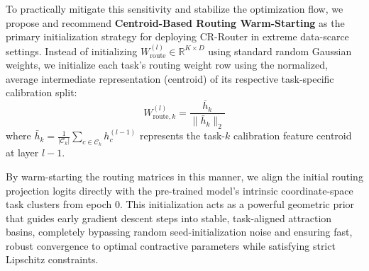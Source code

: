 To practically mitigate this sensitivity and stabilize the optimization flow, we propose and recommend \textbf{Centroid-Based Routing Warm-Starting} as the primary initialization strategy for deploying CR-Router in extreme data-scarce settings. Instead of initializing $W_{\text{route}}^{(l)} \in \mathbb{R}^{K \times D}$ using standard random Gaussian weights, we initialize each task's routing weight row using the normalized, average intermediate representation (centroid) of its respective task-specific calibration split:
\begin{equation}
W_{\text{route}, k}^{(l)} = \frac{\bar{h}_k}{\|\bar{h}_k\|_2}
\end{equation}
where $\bar{h}_k = \frac{1}{|\mathcal{C}_k|} \sum_{c \in \mathcal{C}_k} h_c^{(l-1)}$ represents the task-$k$ calibration feature centroid at layer $l-1$.

By warm-starting the routing matrices in this manner, we align the initial routing projection logits directly with the pre-trained model's intrinsic coordinate-space task clusters from epoch 0. This initialization acts as a powerful geometric prior that guides early gradient descent steps into stable, task-aligned attraction basins, completely bypassing random seed-initialization noise and ensuring fast, robust convergence to optimal contractive parameters while satisfying strict Lipschitz constraints.

